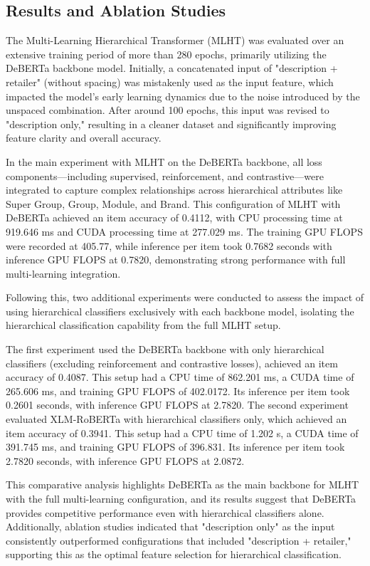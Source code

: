 \documentclass[9pt,a4paper,twoside]{rho-class/rho}
\begin{document}
    \subsection{Results and Ablation Studies}

       The Multi-Learning Hierarchical Transformer (MLHT) was evaluated over an extensive training period of more than 280 epochs, primarily utilizing the DeBERTa backbone model. Initially, a concatenated input of "description + retailer" (without spacing) was mistakenly used as the input feature, which impacted the model’s early learning dynamics due to the noise introduced by the unspaced combination. After around 100 epochs, this input was revised to "description only," resulting in a cleaner dataset and significantly improving feature clarity and overall accuracy.

        In the main experiment with MLHT on the DeBERTa backbone, all loss components—including supervised, reinforcement, and contrastive—were integrated to capture complex relationships across hierarchical attributes like Super Group, Group, Module, and Brand. This configuration of MLHT with DeBERTa achieved an item accuracy of 0.4112, with CPU processing time at 919.646 ms and CUDA processing time at 277.029 ms. The training GPU FLOPS were recorded at 405.77, while inference per item took 0.7682 seconds with inference GPU FLOPS at 0.7820, demonstrating strong performance with full multi-learning integration.
        
        Following this, two additional experiments were conducted to assess the impact of using hierarchical classifiers exclusively with each backbone model, isolating the hierarchical classification capability from the full MLHT setup. 
        
        The first experiment used the DeBERTa backbone with only hierarchical classifiers (excluding reinforcement and contrastive losses), achieved an item accuracy of 0.4087. This setup had a CPU time of 862.201 ms, a CUDA time of 265.606 ms, and training GPU FLOPS of 402.0172. Its inference per item took 0.2601 seconds, with inference GPU FLOPS at 2.7820. The second experiment evaluated XLM-RoBERTa with hierarchical classifiers only, which achieved an item accuracy of 0.3941. This setup had a CPU time of 1.202 s, a CUDA time of 391.745 ms, and training GPU FLOPS of 396.831. Its inference per item took 2.7820 seconds, with inference GPU FLOPS at 2.0872.
        
        This comparative analysis highlights DeBERTa as the main backbone for MLHT with the full multi-learning configuration, and its results suggest that DeBERTa provides competitive performance even with hierarchical classifiers alone. Additionally, ablation studies indicated that "description only" as the input consistently outperformed configurations that included "description + retailer," supporting this as the optimal feature selection for hierarchical classification.
\end{document}
